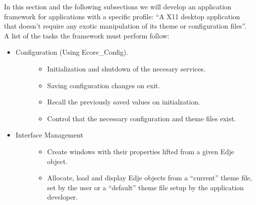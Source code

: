 \documentclass[12pt,a4paper,english]{book}
\begin{document}
In this section and the following subsections we will develop an application
framework for applications with a specific profile: ``A X11 desktop application
that doesn't require any exotic manipulation of its theme or configuration
files''. A list of the tasks the framework must perform follow:
\begin{itemize}
\item {} \begin{description}
\item[{Configuration (Using Ecore{\_}Config).}] %
\begin{itemize}
\item {} 
Initialization and shutdown of the necesary services.

\item {} 
Saving configuration changes on exit.

\item {} 
Recall the previously saved values on initialzation.

\item {} 
Control that the necessary configuration and theme files exist.

\end{itemize}

\end{description}

\item {} \begin{description}
\item[{Interface Management}] %
\begin{itemize}
\item {} 
Create windows with their properties lifted from a given Edje object.

\item {} 
Allocate, load and display Edje objects from a ``current'' theme file, set
by the user or a ``default'' theme file setup by the application developer.

\end{itemize}

\end{description}

\end{itemize}
\end{document}
